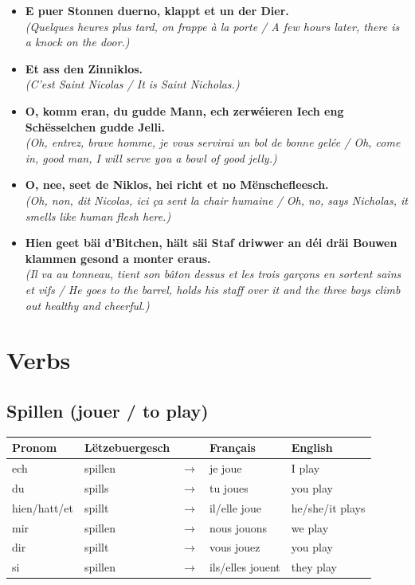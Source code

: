 \begin{itemize}
    \item \textbf{E puer Stonnen duerno, klappt et un der Dier.} \\
    \textit{(Quelques heures plus tard, on frappe à la porte / A few hours later, there is a knock on the door.)}
    \item \textbf{Et ass den Zinniklos.} \\
    \textit{(C'est Saint Nicolas / It is Saint Nicholas.)}
    \item \textbf{O, komm eran, du gudde Mann, ech zerwéieren Iech eng Schësselchen gudde Jelli.} \\
    \textit{(Oh, entrez, brave homme, je vous servirai un bol de bonne gelée / Oh, come in, good man, I will serve you a bowl of good jelly.)}
    \item \textbf{O, nee, seet de Niklos, hei richt et no Mënschefleesch.} \\
    \textit{(Oh, non, dit Nicolas, ici ça sent la chair humaine / Oh, no, says Nicholas, it smells like human flesh here.)}
    \item \textbf{Hien geet bäi d’Bitchen, hält säi Staf driwwer an déi dräi Bouwen klammen gesond a monter eraus.} \\
    \textit{(Il va au tonneau, tient son bâton dessus et les trois garçons en sortent sains et vifs / He goes to the barrel, holds his staff over it and the three boys climb out healthy and cheerful.)}
\end{itemize}

\section{Verbs}
\subsection*{Spillen (jouer / to play)}
\begin{tabular}{ll c l l}
\toprule
\textbf{Pronom} & \textbf{Lëtzebuergesch} & \textbf{} & \textbf{Français} & \textbf{English} \\
\midrule
ech & spillen & $\rightarrow$ & je joue & I play \\
du & spills & $\rightarrow$ & tu joues & you play \\
hien/hatt/et & spillt & $\rightarrow$ & il/elle joue & he/she/it plays \\
mir & spillen & $\rightarrow$ & nous jouons & we play \\
dir & spillt & $\rightarrow$ & vous jouez & you play \\
si & spillen & $\rightarrow$ & ils/elles jouent & they play \\
\bottomrule
\end{tabular}

